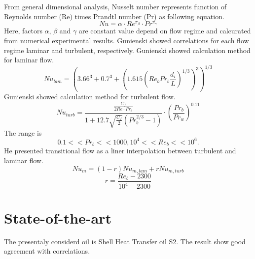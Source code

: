 \documentclass[conference]{IEEEtran}
\begin{document}
From general dimensional analysis, Nusselt number represents function of Reynolds number (Re) times Prandtl number (Pr) as following equation.
\begin{equation}
Nu=\alpha \cdot Re^{\pi_{\beta}}\cdot Pr^{\pi_{\gamma}}\label{Nu_dimensional}
\end{equation}
Here, factors $\alpha$, $\beta$ and $\gamma$ are constant value depend on flow regime and calcurated from numerical experimental results.
Gunienski\cite{Gnienlinski2010} showed correlations for each flow regime laminar and turbulent, respectively.
Gunienski\cite{Gnienlinski2010} showed calculation method for laminar flow.
\begin{equation}
Nu_{lam}=(3.66^{3}+0.7^{3}+(1.615(Re_{b}Pr_{b}\frac{d_{i}}{L})^{1/3})^{3})^{1/3}\label{Nu_laminar}
\end{equation}
Gunienski\cite{Gnienlinski2010} showed calculation method for turbulent flow.
\begin{equation}
Nu_{turb}=\frac{\frac{C_{f}}{2Re\cdot Pr_{b}}}{1+12.7 \sqrt{\frac{C_{f}}{2}}(Pr_{b}^{2/3}-1)}\cdot (\frac{Pr_{b}}{Pr_{w}})^{0.11}
\end{equation}
The range is
\begin{equation}
0.1<<Pr_{b}<<1000, 10^{4}<<Re_{b}<<10^{6}.
\end{equation}
He presented transitional flow as a liner interpolation between turbulent and laminar flow.
\begin{equation}
Nu_{m}=(1-r)Nu_{m,lam}+rNu_{m,turb}
\label{Nu_m}
\end{equation}
\begin{equation}
r=\frac{Re_{b}-2300}{10^{4}-2300}
\end{equation}

\section{State-of-the-art}
The presentaly considerd oil is Shell Heat Transfer oil S2.
The result show good agreement with correlations.
\end{document}
